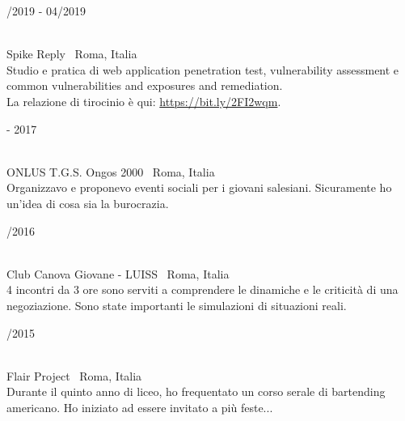 \begin{minipage}{.3\textwidth}
	/2019 - 04/2019 \faCalendar
\end{minipage}
\hfill
\begin{minipage}{.65\textwidth}
	\vfill
	 \\
	\color{Maroon} Spike Reply \color{Sepia} \hfill \faMapMarker \ Roma, Italia
	\smallskip
	\\
	\color{gray} Studio e pratica di web application penetration test, vulnerability assessment e common vulnerabilities and exposures and remediation. \\ La relazione di tirocinio è qui: \url{https://bit.ly/2FI2wqm}.
	\vfill
\end{minipage}

\bigskip

\begin{minipage}{.3\textwidth}
	 - 2017 \faCalendar
\end{minipage}
\hfill
\begin{minipage}{.65\textwidth}
	\vfill
	 \\
	\color{Maroon} ONLUS T.G.S. Ongos 2000 \color{Sepia} \hfill \faMapMarker \ Roma, Italia
	\smallskip
	\\
	\color{gray} Organizzavo e proponevo eventi sociali per i giovani salesiani. Sicuramente ho un'idea di cosa sia la burocrazia.
	\vfill
\end{minipage}

\bigskip

\begin{minipage}{.3\textwidth}
	/2016 \faCalendar
\end{minipage}
\hfill
\begin{minipage}{.65\textwidth}
	\vfill
	 \\
	\color{Maroon} Club Canova Giovane - LUISS \color{Sepia} \hfill \faMapMarker \ Roma, Italia
	\smallskip
	\\
	\color{gray} 4 incontri da 3 ore sono serviti a comprendere le dinamiche e le criticità di una negoziazione. Sono state importanti le simulazioni di situazioni reali.
	\vfill
\end{minipage}

\bigskip

\begin{minipage}{.3\textwidth}
	/2015 \faCalendar
\end{minipage}
\hfill
\begin{minipage}{.65\textwidth}
	\vfill
	 \\
	\color{Maroon} Flair Project \color{Sepia} \hfill \faMapMarker \ Roma, Italia
	\smallskip
	\\
	\color{gray} Durante il quinto anno di liceo, ho frequentato un corso serale di bartending americano. Ho iniziato ad essere invitato a più feste...
	\vfill
\end{minipage}

